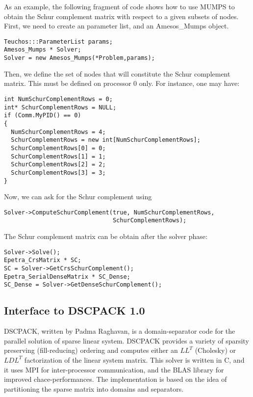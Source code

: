 \documentclass[11pt]{SANDreport}
\begin{document}
\smallskip

As an example, the following fragment of code shows how to use MUMPS to
obtain the Schur complement matrix with respect to a given subsets of
nodes.  First, we need to create an parameter list, and an Amesos\_Mumps
object.
\begin{verbatim}
Teuchos:::ParameterList params;
Amesos_Mumps * Solver;
Solver = new Amesos_Mumps(*Problem,params);
\end{verbatim}
Then, we define the set of nodes that will constitute the Schur
complement matrix. This must be defined on processor 0 only. For
instance, one may have:
\begin{verbatim}
int NumSchurComplementRows = 0;
int* SchurComplementRows = NULL;
if (Comm.MyPID() == 0) 
{
  NumSchurComplementRows = 4;
  SchurComplementRows = new int[NumSchurComplementRows];
  SchurComplementRows[0] = 0;
  SchurComplementRows[1] = 1; 
  SchurComplementRows[2] = 2;
  SchurComplementRows[3] = 3;
}
\end{verbatim}
Now, we can ask for the Schur complement using
\begin{verbatim}  
Solver->ComputeSchurComplement(true, NumSchurComplementRows,
                               SchurComplementRows);
\end{verbatim}
The Schur complement matrix can be obtain after the solver phase:  
\begin{verbatim}  
Solver->Solve();
Epetra_CrsMatrix * SC;
SC = Solver->GetCrsSchurComplement();
Epetra_SerialDenseMatrix * SC_Dense;
SC_Dense = Solver->GetDenseSchurComplement();
\end{verbatim}

\subsection{Interface to DSCPACK 1.0}
\label{sec:dscpack}

DSCPACK, written by  Padma Raghavan, is a domain-separator code for the
parallel solution of sparse linear system.
DSCPACK provides a variety of sparsity preserving (fill-reducing) ordering and
computes either an $LL^T$ (Cholesky) or $LDL^T$ factorization of the linear
system matrix. This solver is written in C, and it uses MPI for
inter-processor communication, and the BLAS library for improved
chace-performances. The implementation is based on the idea of partitioning
the sparse matrix into domains and separators. 
\end{document}
